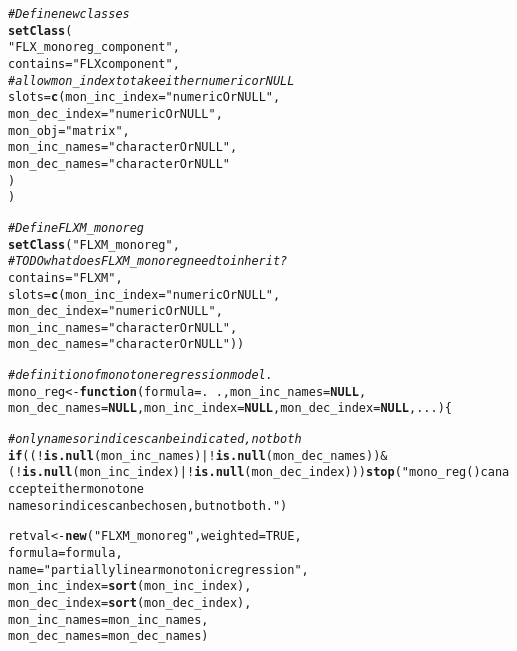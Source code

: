\documentclass[10pt]{olplainarticle}\usepackage[]{graphicx}\usepackage[]{color}
\makeatletter
\newcommand{\hlnum}[1]{\textcolor[rgb]{0.686,0.059,0.569}{#1}}%
\newcommand{\hlstr}[1]{\textcolor[rgb]{0.192,0.494,0.8}{#1}}%
\newcommand{\hlcom}[1]{\textcolor[rgb]{0.678,0.584,0.686}{\textit{#1}}}%
\newcommand{\hlopt}[1]{\textcolor[rgb]{0,0,0}{#1}}%
\newcommand{\hlstd}[1]{\textcolor[rgb]{0.345,0.345,0.345}{#1}}%
\newcommand{\hlkwa}[1]{\textcolor[rgb]{0.161,0.373,0.58}{\textbf{#1}}}%
\newcommand{\hlkwb}[1]{\textcolor[rgb]{0.69,0.353,0.396}{#1}}%
\newcommand{\hlkwc}[1]{\textcolor[rgb]{0.333,0.667,0.333}{#1}}%
\newcommand{\hlkwd}[1]{\textcolor[rgb]{0.737,0.353,0.396}{\textbf{#1}}}%
\newenvironment{kframe}{%
 \def\at@end@of@kframe{}%
 \ifinner\ifhmode%
  \def\at@end@of@kframe{\end{minipage}}%
  \begin{minipage}{\columnwidth}%
 \fi\fi%
 \def\FrameCommand##1{\hskip\@totalleftmargin \hskip-\fboxsep
 \colorbox{shadecolor}{##1}\hskip-\fboxsep
     \hskip-\linewidth \hskip-\@totalleftmargin \hskip\columnwidth}%
 \MakeFramed {\advance\hsize-\width
   \@totalleftmargin\z@ \linewidth\hsize
   \@setminipage}}%
 {\par\unskip\endMakeFramed%
 \at@end@of@kframe}
\newenvironment{knitrout}{}{} %
\makeatother
\begin{document}
\begin{appendices}
\begin{knitrout}
\begin{kframe}
\begin{alltt}
\hlcom{# Define new classes}
\hlkwd{setClass}\hlstd{(}
  \hlstr{"FLX_monoreg_component"}\hlstd{,}
  \hlkwc{contains}\hlstd{=}\hlstr{"FLXcomponent"}\hlstd{,}
  \hlcom{# allow mon_index to take either numeric or NULL}
  \hlkwc{slots}\hlstd{=}\hlkwd{c}\hlstd{(}\hlkwc{mon_inc_index}\hlstd{=}\hlstr{"numericOrNULL"}\hlstd{,}
          \hlkwc{mon_dec_index}\hlstd{=}\hlstr{"numericOrNULL"}\hlstd{,}
          \hlkwc{mon_obj}\hlstd{=}\hlstr{"matrix"}\hlstd{,}
          \hlkwc{mon_inc_names}\hlstd{=}\hlstr{"characterOrNULL"}\hlstd{,}
          \hlkwc{mon_dec_names}\hlstd{=}\hlstr{"characterOrNULL"}
          \hlstd{)}
\hlstd{)}

\hlcom{# Define FLXM_monoreg }
\hlkwd{setClass}\hlstd{(}\hlstr{"FLXM_monoreg"}\hlstd{,}
         \hlcom{# TODO what does FLXM_monoreg need to inherit?}
         \hlkwc{contains} \hlstd{=} \hlstr{"FLXM"}\hlstd{,}
         \hlkwc{slots} \hlstd{=} \hlkwd{c}\hlstd{(}\hlkwc{mon_inc_index}\hlstd{=}\hlstr{"numericOrNULL"}\hlstd{,}
                   \hlkwc{mon_dec_index}\hlstd{=}\hlstr{"numericOrNULL"}\hlstd{,}
                   \hlkwc{mon_inc_names}\hlstd{=}\hlstr{"characterOrNULL"}\hlstd{,}
                   \hlkwc{mon_dec_names}\hlstd{=}\hlstr{"characterOrNULL"}\hlstd{))}






\hlcom{# definition of monotone regression model.}
\hlstd{mono_reg} \hlkwb{<-} \hlkwa{function} \hlstd{(}\hlkwc{formula} \hlstd{= .}\hlopt{~}\hlstd{.,} \hlkwc{mon_inc_names} \hlstd{=} \hlkwa{NULL}\hlstd{,}
                      \hlkwc{mon_dec_names} \hlstd{=} \hlkwa{NULL}\hlstd{,} \hlkwc{mon_inc_index}\hlstd{=}\hlkwa{NULL}\hlstd{,} \hlkwc{mon_dec_index}\hlstd{=}\hlkwa{NULL}\hlstd{,} \hlkwc{...}\hlstd{) \{}

  \hlcom{# only names or indices can be indicated, not both}
  \hlkwa{if}\hlstd{((}\hlopt{!}\hlkwd{is.null}\hlstd{(mon_inc_names)}\hlopt{|!}\hlkwd{is.null}\hlstd{(mon_dec_names))} \hlopt{&}
     \hlstd{(}\hlopt{!}\hlkwd{is.null}\hlstd{(mon_inc_index)}\hlopt{|!}\hlkwd{is.null}\hlstd{(mon_dec_index)))} \hlkwd{stop}\hlstd{(}\hlstr{"mono_reg() can accept either monotone
                                                             names or indices can be chosen, but not both."}\hlstd{)}

  \hlstd{retval} \hlkwb{<-} \hlkwd{new}\hlstd{(}\hlstr{"FLXM_monoreg"}\hlstd{,} \hlkwc{weighted} \hlstd{=} \hlnum{TRUE}\hlstd{,}
                \hlkwc{formula} \hlstd{= formula,}
                \hlkwc{name} \hlstd{=} \hlstr{"partially linear monotonic regression"}\hlstd{,}
                \hlkwc{mon_inc_index}\hlstd{=} \hlkwd{sort}\hlstd{(mon_inc_index),}
                \hlkwc{mon_dec_index}\hlstd{=} \hlkwd{sort}\hlstd{(mon_dec_index),}
                \hlkwc{mon_inc_names}\hlstd{= mon_inc_names,}
                \hlkwc{mon_dec_names}\hlstd{= mon_dec_names)}


\end{alltt}
\end{kframe}
\end{knitrout}
\end{appendices}
\end{document}
